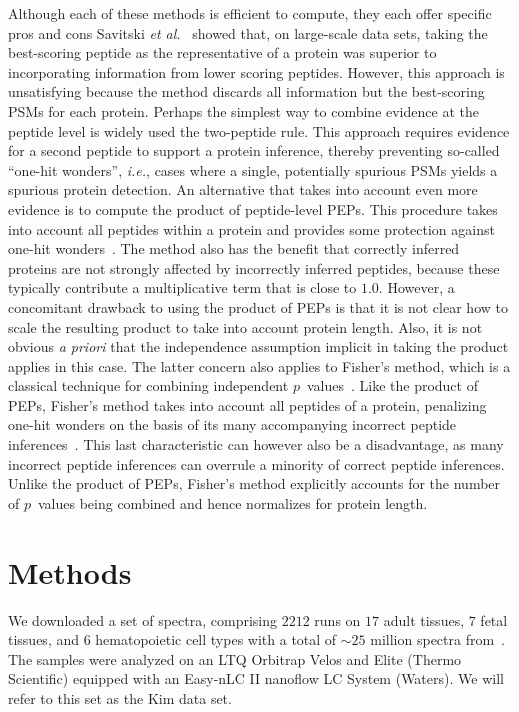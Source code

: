 \documentclass{article}
\begin{document}
Although each of these methods is efficient to compute, they each
offer specific pros and cons Savitski {\em et
  al.}~\cite{savitski2015scalable} showed that, on large-scale data
sets, taking the best-scoring peptide as the representative of a
protein was superior to incorporating information from lower scoring
peptides. However, this approach is unsatisfying because the method
discards all information but the best-scoring PSMs for each protein.
Perhaps the simplest way to combine evidence at the peptide level is
widely used the two-peptide rule.  This approach requires evidence for
a second peptide to support a protein inference, thereby preventing
so-called ``one-hit wonders'', {\em i.e.}, cases where a single,
potentially spurious PSMs yields a spurious protein detection. An
alternative that takes into account even more evidence is to compute
the product of peptide-level PEPs. This procedure takes into account
all peptides within a protein and provides some protection against
one-hit wonders~\cite{cox2008maxquant}. The method also has the
benefit that correctly inferred proteins are not strongly affected by
incorrectly inferred peptides, because these typically contribute a
multiplicative term that is close to $1.0$. However, a concomitant
drawback to using the product of PEPs is that it is not clear how to
scale the resulting product to take into account protein length.
Also, it is not obvious {\em a priori} that the independence
assumption implicit in taking the product applies in this case.  The
latter concern also applies to Fisher's method, which is a classical
technique for combining independent
$p$~values~\cite{fisher1925statistical}. Like the product of PEPs,
Fisher's method takes into account all peptides of a protein,
penalizing one-hit wonders on the basis of its many accompanying
incorrect peptide inferences~\cite{spirin2011assigning, alves2015mass,
  granholm2013determining}.  This last characteristic can however also
be a disadvantage, as many incorrect peptide inferences can overrule a
minority of correct peptide inferences.  Unlike the product of PEPs,
Fisher's method explicitly accounts for the number of $p$~values being
combined and hence normalizes for protein length.

\section*{Methods}

We downloaded a set of spectra, comprising $2212$ runs on $17$ adult
tissues, $7$ fetal tissues, and $6$ hematopoietic cell types with a
total of $\sim 25$ million spectra from~\cite{kim2014draft}. The
samples were analyzed on an LTQ Orbitrap Velos and Elite (Thermo
Scientific) equipped with an Easy-nLC II nanoflow LC System
(Waters). We will refer to this set as the Kim data set.
\end{document}
